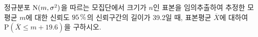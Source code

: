 정규분포 $\mathrm{N}(m{,}\mkern3mu\mathopen{}\sigma^2)$을 따르는 모집단에서 크기가 $n$인 표본을 임의추출하여 추정한 모평균 $m$에 대한 신뢰도 $95\mkern3mu \%$의 신뢰구간의 길이가 39.2일 때, 표본평균 $\overline{X}$에 대하여 $\mathrm{P}(\overline{X}\le m+19.6)$을 구하시오. 
